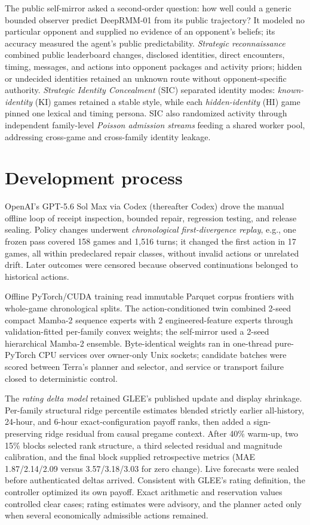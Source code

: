 \documentclass{article}
\newcommand{\DeepRMM}{DeepRMM-01}
\begin{document}
The public self-mirror asked a second-order question: how well could a generic bounded observer predict \DeepRMM{} from its public trajectory? It modeled no particular opponent and supplied no evidence of an opponent's beliefs; its accuracy measured the agent's public predictability. \emph{Strategic reconnaissance} combined public leaderboard changes, disclosed identities, direct encounters, timing, messages, and actions into opponent packages and activity priors; hidden or undecided identities retained an unknown route without opponent-specific authority. \emph{Strategic Identity Concealment} (SIC) separated identity modes: \emph{known-identity} (KI) games retained a stable style, while each \emph{hidden-identity} (HI) game pinned one lexical and timing persona. SIC also randomized activity through independent family-level \emph{Poisson admission streams} feeding a shared worker pool, addressing cross-game and cross-family identity leakage.

\section{Development process}

OpenAI's GPT-5.6 Sol Max via Codex (thereafter Codex) drove the manual offline loop of receipt inspection, bounded repair, regression testing, and release sealing. Policy changes underwent \emph{chronological first-divergence replay}, e.g., one frozen pass covered 158 games and 1,516 turns; it changed the first action in 17 games, all within predeclared repair classes, without invalid actions or unrelated drift. Later outcomes were censored because observed continuations belonged to historical actions.

Offline PyTorch/CUDA training read immutable Parquet corpus frontiers with whole-game chronological splits. The action-conditioned twin combined 2-seed compact Mamba-2 sequence experts \citep{dao2024mamba2} with 2 engineered-feature experts through validation-fitted per-family convex weights; the self-mirror used a 2-seed hierarchical Mamba-2 ensemble. Byte-identical weights ran in one-thread pure-PyTorch CPU services over owner-only Unix sockets; candidate batches were scored between Terra's planner and selector, and service or transport failure closed to deterministic control.

The \emph{rating delta model} retained GLEE's published update and display shrinkage. Per-family structural ridge percentile estimates blended strictly earlier all-history, 24-hour, and 6-hour exact-configuration payoff ranks, then added a sign-preserving ridge residual from causal pregame context. After 40\% warm-up, two 15\% blocks selected rank structure, a third selected residual and magnitude calibration, and the final block supplied retrospective metrics (MAE 1.87/2.14/2.09 versus 3.57/3.18/3.03 for zero change). Live forecasts were sealed before authenticated deltas arrived. Consistent with GLEE's rating definition, the controller optimized its own payoff. Exact arithmetic and reservation values controlled clear cases; rating estimates were advisory, and the planner acted only when several economically admissible actions remained.
\end{document}
